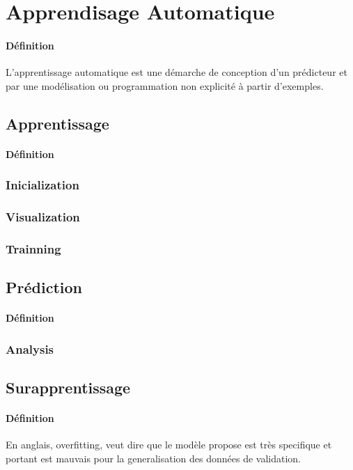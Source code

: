 \documentclass{article}
\begin{document}
\section{Apprendisage Automatique}
\paragraph{Définition}L'apprentissage automatique est une démarche de conception d'un prédicteur et par une modélisation ou programmation non explicité à partir d'exemples.

\subsection{Apprentissage}
\paragraph{Définition}
\subsubsection{Inicialization}
\subsubsection{Visualization}
\subsubsection{Trainning}


\subsection{Prédiction}
\paragraph{Définition}
\subsubsection{Analysis}

\subsection{Surapprentissage}
\paragraph{Définition}En anglais, overfitting, veut dire que le modèle propose est très specifique et portant est mauvais pour la generalisation des données de validation.
\end{document}
